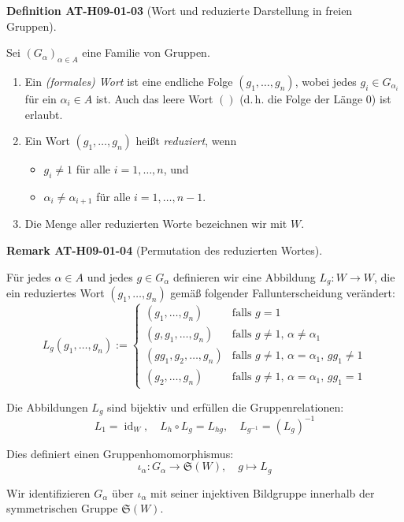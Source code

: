 \documentclass[10pt, letterpaper]{article}
\newcommand{\CustomHeading}[3]{%
  \par\medskip\noindent%
  \textbf{#1 #2} \textnormal{(#3)}.\enskip%
}
\newenvironment{DEF}[2]{\CustomHeading{Definition}{#1}{#2}}{}
\newenvironment{REM}[2]{\CustomHeading{Remark}{#1}{#2}}{}
\begin{document}
\begin{DEF}{AT-H09-01-03}{Wort und reduzierte Darstellung in freien Gruppen}
Sei $(G_\alpha)_{\alpha \in A}$ eine Familie von Gruppen.
\begin{enumerate}
  \item Ein \emph{(formales) Wort} ist eine endliche Folge $(g_1, \dots, g_n)$, wobei jedes $g_i \in G_{\alpha_i}$ für ein $\alpha_i \in A$ ist. Auch das leere Wort $()$ (d.\,h. die Folge der Länge 0) ist erlaubt.
  
  \item Ein Wort $(g_1, \dots, g_n)$ heißt \emph{reduziert}, wenn
  \begin{itemize}
    \item $g_i \neq 1$ für alle $i = 1, \dots, n$, und
    \item $\alpha_i \neq \alpha_{i+1}$ für alle $i = 1, \dots, n-1$.
  \end{itemize}
  
  \item Die Menge aller reduzierten Worte bezeichnen wir mit $W$.
\end{enumerate}
\end{DEF}

\begin{REM}{AT-H09-01-04}{Permutation des reduzierten Wortes}
Für jedes $\alpha \in A$ und jedes $g \in G_\alpha$ definieren wir eine Abbildung $L_g: W \to W$, die ein reduziertes Wort $(g_1, \dots, g_n)$ gemäß folgender Fallunterscheidung verändert:
\[
L_g(g_1, \dots, g_n) :=
\begin{cases}
(g_1, \dots, g_n) & \text{falls } g = 1 \\
(g, g_1, \dots, g_n) & \text{falls } g \neq 1,\, \alpha \neq \alpha_1 \\
(gg_1, g_2, \dots, g_n) & \text{falls } g \neq 1,\, \alpha = \alpha_1,\, gg_1 \neq 1 \\
(g_2, \dots, g_n) & \text{falls } g \neq 1,\, \alpha = \alpha_1,\, gg_1 = 1
\end{cases}
\]

Die Abbildungen $L_g$ sind bijektiv und erfüllen die Gruppenrelationen:
\[
L_1 = \operatorname{id}_W, \quad L_h \circ L_g = L_{hg}, \quad L_{g^{-1}} = (L_g)^{-1}
\]

Dies definiert einen Gruppenhomomorphismus:
\[
\iota_\alpha: G_\alpha \rightarrow \mathfrak{S}(W), \quad g \mapsto L_g
\]

Wir identifizieren $G_\alpha$ über $\iota_\alpha$ mit seiner injektiven Bildgruppe innerhalb der symmetrischen Gruppe $\mathfrak{S}(W)$.
\end{REM}
\end{document}
